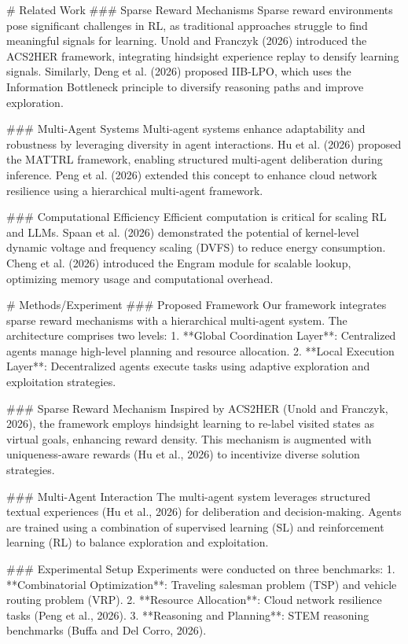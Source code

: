 # Related Work  
### Sparse Reward Mechanisms  
Sparse reward environments pose significant challenges in RL, as traditional approaches struggle to find meaningful signals for learning. Unold and Franczyk (2026) introduced the ACS2HER framework, integrating hindsight experience replay to densify learning signals. Similarly, Deng et al. (2026) proposed IIB-LPO, which uses the Information Bottleneck principle to diversify reasoning paths and improve exploration.

### Multi-Agent Systems  
Multi-agent systems enhance adaptability and robustness by leveraging diversity in agent interactions. Hu et al. (2026) proposed the MATTRL framework, enabling structured multi-agent deliberation during inference. Peng et al. (2026) extended this concept to enhance cloud network resilience using a hierarchical multi-agent framework.

### Computational Efficiency  
Efficient computation is critical for scaling RL and LLMs. Spaan et al. (2026) demonstrated the potential of kernel-level dynamic voltage and frequency scaling (DVFS) to reduce energy consumption. Cheng et al. (2026) introduced the Engram module for scalable lookup, optimizing memory usage and computational overhead.

# Methods/Experiment  
### Proposed Framework  
Our framework integrates sparse reward mechanisms with a hierarchical multi-agent system. The architecture comprises two levels:  
1. **Global Coordination Layer**: Centralized agents manage high-level planning and resource allocation.
2. **Local Execution Layer**: Decentralized agents execute tasks using adaptive exploration and exploitation strategies.

### Sparse Reward Mechanism  
Inspired by ACS2HER (Unold and Franczyk, 2026), the framework employs hindsight learning to re-label visited states as virtual goals, enhancing reward density. This mechanism is augmented with uniqueness-aware rewards (Hu et al., 2026) to incentivize diverse solution strategies.

### Multi-Agent Interaction  
The multi-agent system leverages structured textual experiences (Hu et al., 2026) for deliberation and decision-making. Agents are trained using a combination of supervised learning (SL) and reinforcement learning (RL) to balance exploration and exploitation.

### Experimental Setup  
Experiments were conducted on three benchmarks:  
1. **Combinatorial Optimization**: Traveling salesman problem (TSP) and vehicle routing problem (VRP).  
2. **Resource Allocation**: Cloud network resilience tasks (Peng et al., 2026).  
3. **Reasoning and Planning**: STEM reasoning benchmarks (Buffa and Del Corro, 2026).

